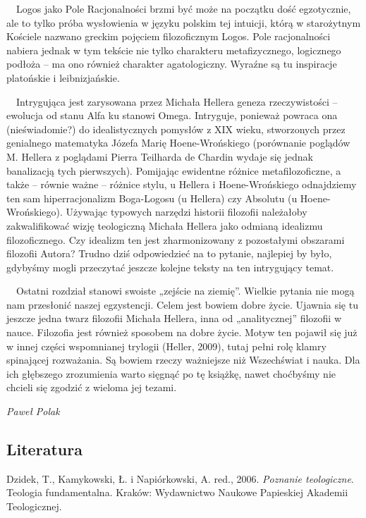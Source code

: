 \documentclass[a4paper]{article}
\newcommand\textstyleDomylnaczcionkaakapitu[1]{#1}
\begin{document}
\ \ Logos jako Pole Racjonalności brzmi być może na początku dość egzotycznie, ale to tylko próba wysłowienia w języku
polskim tej intuicji, którą w starożytnym Kościele nazwano greckim pojęciem filozoficznym Logos. Pole racjonalności
nabiera jednak w tym tekście nie tylko charakteru metafizycznego, logicznego podłoża – ma ono również charakter
agatologiczny. Wyraźne są tu inspiracje platońskie i leibnizjańskie.

\ \ Intrygująca jest zarysowana przez Michała Hellera geneza rzeczywistości – ewolucja od stanu Alfa ku stanowi Omega.
Intryguje, ponieważ powraca ona (nieświadomie?) do idealistycznych pomysłów z XIX wieku, stworzonych przez genialnego
matematyka Józefa Marię Hoene-Wrońskiego (porównanie poglądów M. Hellera z poglądami Pierra Teilharda de Chardin wydaje
się jednak banalizacją tych pierwszych). Pomijając ewidentne różnice metafilozoficzne, a także – równie ważne – różnice
stylu, u Hellera i Hoene-Wrońskiego odnajdziemy ten sam hiperracjonalizm Boga-Logosu (u Hellera) czy Absolutu (u
Hoene-Wrońskiego). Używając typowych narzędzi historii filozofii należałoby zakwalifikować wizję teologiczną Michała
Hellera jako odmianą idealizmu filozoficznego. Czy idealizm ten jest zharmonizowany z pozostałymi obszarami filozofii
Autora? Trudno dziś odpowiedzieć na to pytanie, najlepiej by było, gdybyśmy mogli przeczytać jeszcze kolejne teksty na
ten intrygujący temat.

\ \ Ostatni rozdział stanowi swoiste „zejście na ziemię”. Wielkie pytania nie mogą nam przesłonić naszej egzystencji.
Celem jest bowiem dobre życie. Ujawnia się tu jeszcze jedna twarz filozofii Michała Hellera, inna od „analitycznej”
filozofii w nauce. Filozofia jest również sposobem na dobre życie. Motyw ten pojawił się już w innej części wspomnianej
trylogii (Heller, 2009), tutaj pełni rolę klamry spinającej rozważania. Są bowiem rzeczy ważniejsze niż Wszechświat i
nauka. Dla ich głębszego zrozumienia warto sięgnąć po tę książkę, nawet choćbyśmy nie chcieli się zgodzić z wieloma jej
tezami.

{\raggedleft\itshape
Paweł Polak
\par}

\subsection{Literatura}
Dzidek, T., Kamykowski, Ł. i Napiórkowski, A. red., 2006. \textstyleDomylnaczcionkaakapitu{\textit{Poznanie
teologiczne}}. Teologia fundamentalna. Kraków: Wydawnictwo Naukowe Papieskiej Akademii Teologicznej.
\end{document}
